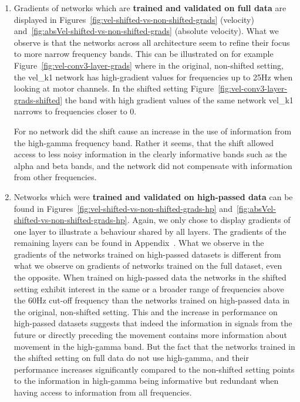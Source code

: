 \begin{enumerate}
    \item Gradients of networks which are \textbf{trained and validated on full data} are displayed in Figures~\ref{fig:vel-shifted-vs-non-shifted-grads} (velocity) and~\ref{fig:absVel-shifted-vs-non-shifted-grads} (absolute velocity).
    What we observe is that the networks across all architecture seem to refine their focus to more narrow frequency bands.
    This can be illustrated on for example Figure~\ref{fig:vel-conv3-layer-grads} where in the original, non-shifted setting, the vel\_k1 network has high-gradient values for frequencies up to 25Hz when looking at motor channels.
    In the shifted setting Figure~\ref{fig:vel-conv3-layer-grads-shifted} the band with high gradient values of the same network vel\_k1 narrows to frequencies closer to 0.
    
    For no network  did the shift cause an increase in the use of information from the high-gamma frequency band.
    Rather it seems, that the shift allowed access to less noisy information in the clearly informative bands such as the alpha and beta bands, and the network did not compensate with information from other frequencies.
    \item Networks which were \textbf{trained and validated on high-passed data} can be found in Figures~\ref{fig:vel-shifted-vs-non-shifted-grads-hp} and~\ref{fig:absVel-shifted-vs-non-shifted-grads-hp}.
    Again, we only chose to display gradients of one layer to illustrate a behaviour shared by all layers.
    The gradients of the remaining layers can be found in Appendix~.
    What we observe in the gradients of the networks trained on high-passed datasets is different from what we observe on gradients of networks trained on the full dataset, even the opposite.
    When trained on high-passed data the networks in the shifted setting exhibit interest in the same or a broader range of frequencies above the 60Hz cut-off frequency than the networks trained on high-passed data in the original, non-shifted setting.
    This and the increase in performance on high-passed datasets suggests that indeed the information in signals from the future or directly preceding the movement contains more information about movement in the high-gamma band.
    But the fact that the networks trained in the shifted setting on full data do not use high-gamma, and their performance increases significantly compared to the non-shifted setting points to the information in high-gamma being informative but redundant when having access to information from all frequencies.
\end{enumerate}

